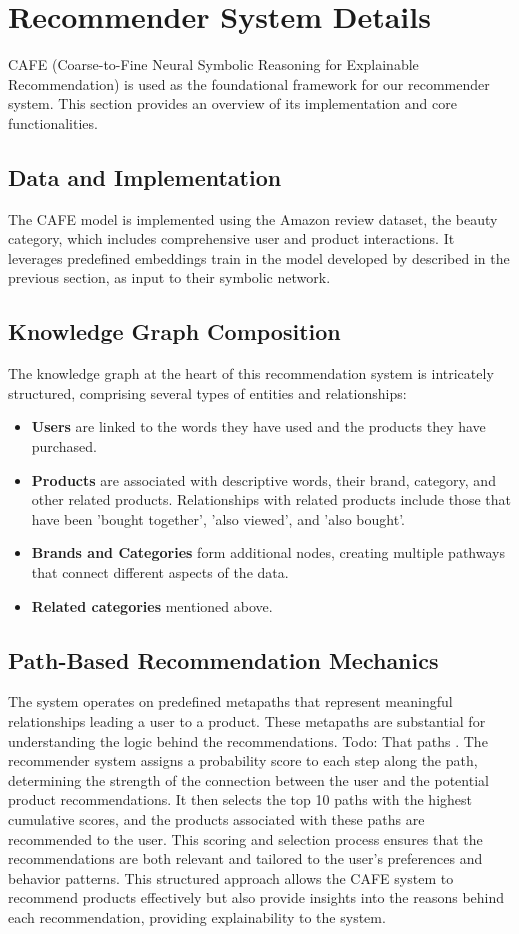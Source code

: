 \section{Recommender System Details}
CAFE (Coarse-to-Fine Neural Symbolic Reasoning for Explainable Recommendation) is
used as the foundational framework for our recommender system. This section
provides an overview of its implementation and core functionalities.
\subsection{Data and Implementation}
The CAFE model is implemented using the Amazon review dataset, the beauty
category, which includes comprehensive user and product interactions. It
leverages predefined embeddings train in the model developed by \textcite{ai_learning_2018} described
in the previous section, as input to their symbolic network.
\subsection{Knowledge Graph Composition}
The knowledge graph at the heart of this recommendation system is intricately structured,
comprising several types of entities and relationships:
\begin{itemize}
	\item \textbf{Users} are linked to the words they have used and the products
		they have purchased.

	\item \textbf{Products} are associated with descriptive words, their brand,
		category, and other related products. Relationships with related products
		include those that have been 'bought together', 'also viewed', and 'also bought'.

	\item \textbf{Brands and Categories} form additional nodes, creating multiple pathways
		that connect different aspects of the data.

	\item \textbf{Related categories} mentioned above.
\end{itemize}

\subsection{Path-Based Recommendation Mechanics}
The system operates on predefined metapaths that represent meaningful
relationships leading a user to a product. These metapaths are substantial for understanding
the logic behind the recommendations. Todo: That paths . The recommender system assigns
a probability score to each step along the path, determining the strength of the
connection between the user and the potential product recommendations. It then selects
the top 10 paths with the highest cumulative scores, and the products associated
with these paths are recommended to the user. This scoring and selection process
ensures that the recommendations are both relevant and tailored to the user's preferences
and behavior patterns. This structured approach allows the CAFE system to
recommend products effectively but also provide insights into the reasons behind
each recommendation, providing explainability to the system.

